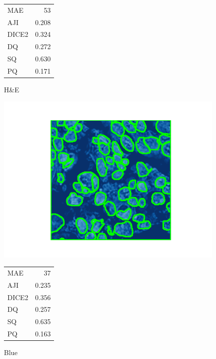 \documentclass[target=bach,aauheader=,style=]{thud}
\begin{document}
\begin{figure}[ht]
\begin{minipage}{0.48\textwidth}
  \footnotesize
  \begin{tabular}{@{}lr@{}}
   MAE & 53\\ AJI & 0.208\\ DICE2 & 0.324\\
   DQ & 0.272\\ SQ & 0.630\\ PQ & 0.171
  \end{tabular}
  \caption*{H\&E}
\end{minipage}

\vspace{0.4em}

\begin{minipage}{0.48\textwidth}\centering
  \includegraphics[width=\linewidth]{imgs/qualitative/worst/Blu/contour_img.png}\\[-1ex]
  \footnotesize
  \begin{tabular}{@{}lr@{}}
   MAE & 37\\ AJI & 0.235\\ DICE2 & 0.356\\
   DQ & 0.257\\ SQ & 0.635\\ PQ & 0.163
  \end{tabular}
  \caption*{Blue}
\end{minipage}\hfill
\begin{minipage}{0.48\textwidth}\centering

\end{minipage}
\end{figure}
\end{document}
